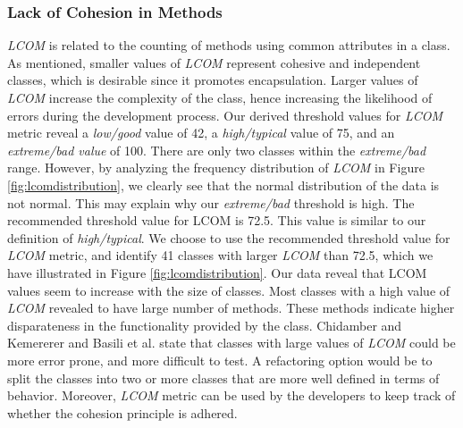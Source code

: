 \subsubsection{Lack of Cohesion in Methods}


\textit{LCOM} is related to the counting of methods using common attributes in a class. As mentioned, smaller values of \textit{LCOM} represent cohesive and independent classes, which is desirable since it promotes encapsulation. Larger values of \textit{LCOM} increase the complexity of the class, hence increasing the likelihood of errors during the development process. Our derived threshold values for \textit{LCOM} metric reveal a \textit{low/good} value of 42, a \textit{high/typical} value of 75, and an \textit{extreme/bad value} of 100. There are only two classes within the \textit{extreme/bad} range. However, by analyzing the frequency distribution of \textit{LCOM} in Figure \ref{fig:lcomdistribution}, we clearly see that the normal distribution of the data is not normal. This may explain why our \textit{extreme/bad} threshold is high. The recommended threshold value for LCOM is 72.5. This value is similar to our definition of \textit{high/typical}. We choose to use the recommended threshold value for \textit{LCOM} metric, and identify 41 classes with larger \textit{LCOM} than 72.5, which we have illustrated in Figure \ref{fig:lcomdistribution}. Our data reveal that LCOM values seem to increase with the size of classes. Most classes with a high value of \textit{LCOM} revealed to have large number of methods. These methods indicate higher disparateness in the functionality provided by the class. Chidamber and Kemererer\cite{chidamber1994metrics} and Basili et al.\cite{basili1996validation} state that classes with large values of \textit{LCOM} could be more error prone, and more difficult to test. A refactoring option would be to split the classes into two or more classes that are more well defined in terms of behavior. Moreover, \textit{LCOM} metric can be used by the developers to keep track of whether the cohesion principle is adhered.


